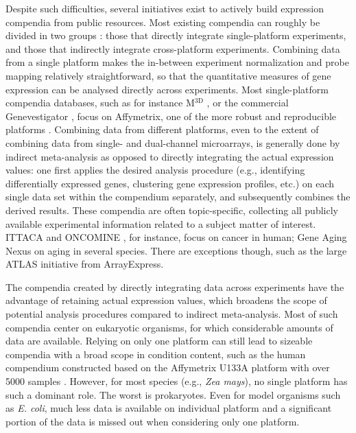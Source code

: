 Despite such difficulties, several initiatives exist to actively build
expression compendia from public resources.
%
Most existing compendia can roughly be divided in two groups \cite{Fierro2008}:
those that directly integrate single-platform experiments, and those that
indirectly integrate cross-platform experiments.
%
Combining data from a single platform makes the in-between experiment
normalization and probe mapping relatively straightforward, so that the
quantitative measures of gene expression can be analysed directly across
experiments.
%
Most single-platform compendia databases, such as for instance
M$^{\textrm{3D}}$ \cite{Faith2008}, or the commercial Genevestigator
\cite{Hruz2008}, focus on Affymetrix, one of the more robust and reproducible
platforms \cite{Bammler2005, Irizarry2005}.
%
Combining data from different platforms, even to the extent of combining data
from single- and dual-channel microarrays, is generally done by indirect
meta-analysis as opposed to directly integrating the actual expression values:
one first applies the desired analysis procedure (e.g., identifying
differentially expressed genes, clustering gene expression profiles, etc.) on
each single data set within the compendium separately, and subsequently
combines the derived results.
%
These compendia are often topic-specific, collecting all publicly available
experimental information related to a subject matter of interest.  ITTACA
\cite{Elfilali2006} and ONCOMINE \cite{Rhodes2007}, for instance, focus on
cancer in human; Gene Aging Nexus \cite{Pan2007} on aging in several species.
%
There are exceptions though, such as the large ATLAS \cite{Kapushesky2010}
initiative from ArrayExpress.


The compendia created by directly integrating data across experiments have the
advantage of retaining actual expression values, which broadens the scope of
potential analysis procedures compared to indirect meta-analysis.
%
Most of such compendia center on eukaryotic organisms, for which considerable
amounts of data are available.
%
Relying on only one platform can still lead to sizeable compendia with a broad
scope in condition content, such as the human compendium constructed based on
the Affymetrix U133A platform with over 5000 samples \cite{Lukk2010}.  However,
for most species (e.g., \textit{Zea mays}), no single platform has such a
dominant role.
%
The worst is prokaryotes.  Even for model organisms such as {\it E. coli}, much
less data is available on individual platform and a significant portion of the
data is missed out when considering only one platform.


